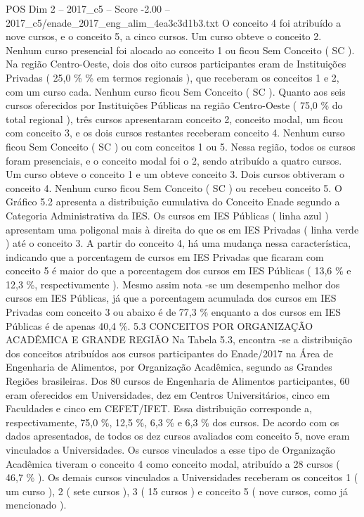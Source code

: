 \begin{textsample}{POS Dim 2 – 2017\_c5 – Score -2.00 – 2017\_c5/enade\_2017\_eng\_alim\_4ea3c3d1b3.txt}
O conceito 4 foi atribuído a nove cursos, e o conceito 5, a cinco cursos.
Um curso obteve o conceito 2.
Nenhum curso presencial foi alocado ao conceito 1 ou ficou Sem Conceito ( SC ).
Na região Centro-Oeste, dois dos oito cursos participantes eram de Instituições Privadas ( 25,0 \% \% em termos regionais ), que receberam os conceitos 1 e 2, com um curso cada.
Nenhum curso ficou Sem Conceito ( SC ).
Quanto aos seis cursos oferecidos por Instituições Públicas na região Centro-Oeste ( 75,0 \% do total regional ), três cursos apresentaram conceito 2, conceito modal, um ficou com conceito 3, e os dois cursos restantes receberam conceito 4.
Nenhum curso ficou Sem Conceito ( SC ) ou com conceitos 1 ou 5.
Nessa região, todos os cursos foram presenciais, e o conceito modal foi o 2, sendo atribuído a quatro cursos.
Um curso obteve o conceito 1 e um obteve conceito 3.
Dois cursos obtiveram o conceito 4.
Nenhum curso ficou Sem Conceito ( SC ) ou recebeu conceito 5.
O Gráfico 5.2 apresenta a distribuição cumulativa do Conceito Enade segundo a Categoria Administrativa da IES.
Os cursos em IES Públicas ( linha azul ) apresentam uma poligonal mais à direita do que os em IES Privadas ( linha verde ) até o conceito 3.
A partir do conceito 4, há uma mudança nessa característica, indicando que a porcentagem de cursos em IES Privadas que ficaram com conceito 5 é maior do que a porcentagem dos cursos em IES Públicas ( 13,6 \% e 12,3 \%, respectivamente ).
Mesmo assim nota -se um desempenho melhor dos cursos em IES Públicas, já que a porcentagem acumulada dos cursos em IES Privadas com conceito 3 ou abaixo é de 77,3 \% enquanto a dos cursos em IES Públicas é de apenas 40,4 \%. 5.3 CONCEITOS POR ORGANIZAÇÃO ACADÊMICA E GRANDE REGIÃO Na Tabela 5.3, encontra -se a distribuição dos conceitos atribuídos aos cursos participantes do Enade/2017 na Área de Engenharia de Alimentos, por Organização Acadêmica, segundo as Grandes Regiões brasileiras.
Dos 80 cursos de Engenharia de Alimentos participantes, 60 eram oferecidos em Universidades, dez em Centros Universitários, cinco em Faculdades e cinco em CEFET/IFET.
Essa distribuição corresponde a, respectivamente, 75,0 \%, 12,5 \%, 6,3 \% e 6,3 \% dos cursos.
De acordo com os dados apresentados, de todos os dez cursos avaliados com conceito 5, nove eram vinculados a Universidades.
Os cursos vinculados a esse tipo de Organização Acadêmica tiveram o conceito 4 como conceito modal, atribuído a 28 cursos ( 46,7 \% ).
Os demais cursos vinculados a Universidades receberam os conceitos 1 ( um curso ), 2 ( sete cursos ), 3 ( 15 cursos ) e conceito 5 ( nove cursos, como já mencionado ).

\end{textsample}
